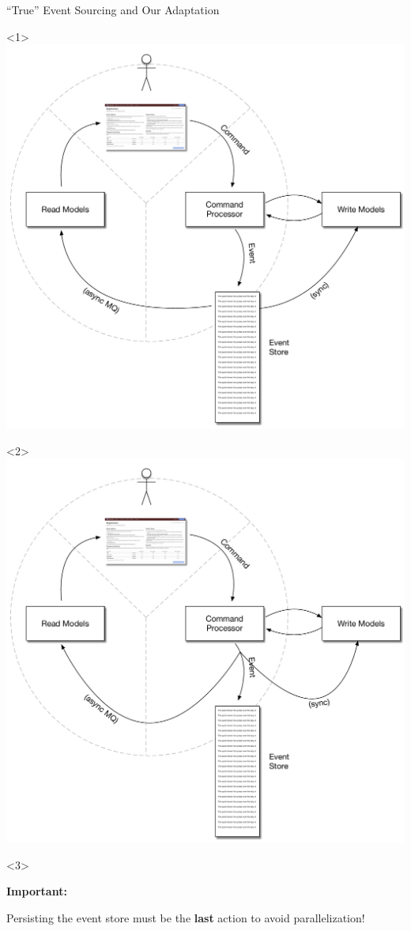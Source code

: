 \begin{frame}[fragile]{``True'' Event Sourcing and Our Adaptation}

\begin{onlyenv}<1>
\includegraphics[width=.7\textwidth]{../EventSourcing4.pdf}
\end{onlyenv}

\begin{onlyenv}<2>
\includegraphics[width=.7\textwidth]{../EventSourcingOurStyle.pdf}
\end{onlyenv}


\begin{onlyenv}<3>

\textbf{Important:}

\vspace{4em}
Persisting the event store must be the \textbf{last} action to avoid parallelization!
\end{onlyenv}

\end{frame}

